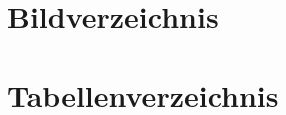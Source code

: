 
\chapter*{Bildverzeichnis}
\makeatletter
{} %
\makeatother
\clearpage


\chapter*{Tabellenverzeichnis}
\makeatletter
{} %
\makeatother
\clearpage